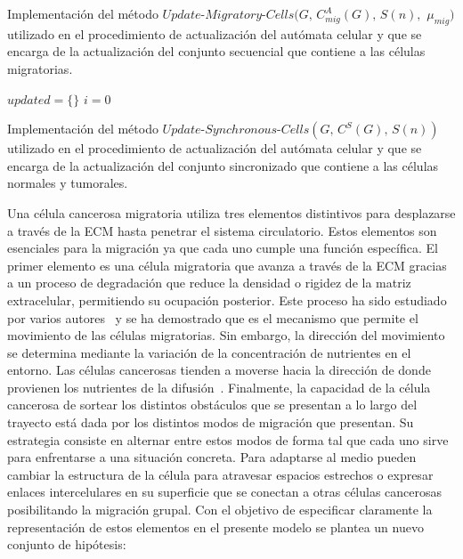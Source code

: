 \begin{algorithm}[!ht]
\caption{Implementaci\'on del m\'etodo $Update$-$Migratory$-$Cells(G,\,C_{mig}^A(G),\,S(n),$ $\mu_{mig})$ utilizado en el procedimiento de actualizaci\'on del aut\'omata celular y que se encarga de la actualizaci\'on del conjunto secuencial que contiene a las c\'elulas migratorias.} \label{alg-update-2-1}
$updated=\lbrace \rbrace$\;
$i=0$\;
\end{algorithm}

\begin{algorithm}[!ht]
\caption{Implementaci\'on del m\'etodo $Update$-$Synchronous$-$Cells(G,\,C^S(G),\,S(n))$ utilizado en el procedimiento de actualizaci\'on del aut\'omata celular y que se encarga de la actualizaci\'on del conjunto sincronizado que contiene a las c\'elulas normales y tumorales.} \label{alg-update-2-2}
\end{algorithm}

Una célula cancerosa migratoria utiliza tres elementos distintivos para desplazarse a través de la ECM hasta penetrar el sistema circulatorio. Estos elementos son esenciales para la migración ya que cada uno cumple una función específica. El primer elemento es una célula migratoria que avanza a través de la ECM gracias a un proceso de degradación que reduce la densidad o rigidez de la matriz extracelular, permitiendo su ocupación posterior. Este proceso ha sido estudiado por varios autores~\cite{kansal3,perumpanani,perumpanani2} y se ha demostrado que es el mecanismo que permite el movimiento de las células migratorias. Sin embargo, la dirección del movimiento se determina mediante la variación de la concentración de nutrientes en el entorno. Las células cancerosas tienden a moverse hacia la dirección de donde provienen los nutrientes de la difusión~\cite{kansal3,nutrients}. Finalmente, la capacidad de la célula cancerosa de sortear los distintos obstáculos que se presentan a lo largo del trayecto está dada por los distintos modos de migración que presentan. Su estrategia consiste en alternar entre estos modos de forma tal que cada uno sirve para enfrentarse a una situación concreta. Para adaptarse al medio pueden cambiar la estructura de la célula para atravesar espacios estrechos o expresar enlaces intercelulares en su superficie que se conectan a otras células cancerosas posibilitando la migración grupal. Con el objetivo de especificar claramente la representaci\'on de estos elementos en el presente modelo se plantea un nuevo conjunto de hip\'otesis:

